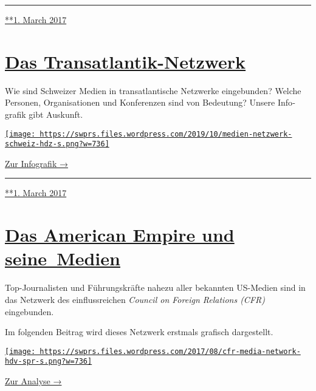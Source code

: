 \begin{center}\rule{0.5\linewidth}{\linethickness}\end{center}

\href{https://swprs.org/2017/03/01/eine-bruecke-ueber-den-atlantik/}{**1.
March 2017}

\hypertarget{das-transatlantik-netzwerk}{%
\section{\texorpdfstring{\href{https://swprs.org/2017/03/01/das-netzwerk/}{Das
Transatlantik-Netzwerk}}{Das Transatlantik-Netzwerk}}\label{das-transatlantik-netzwerk}}

Wie sind Schweizer Medien in trans­at­lantische Netz­werke
ein­ge­bunden? Welche Personen, Organi­sa­tionen und Kon­fe­ren­zen sind
von Bedeutung? Unsere Info­grafik gibt Auskunft.

\href{https://swprs.org/netzwerk-medien-schweiz}{\texttt{[image: https://swprs.files.wordpress.com/2019/10/medien-netzwerk-schweiz-hdz-s.png?w=736]}}

\href{https://swprs.org/netzwerk-medien-schweiz}{Zur Infografik →}

\begin{center}\rule{0.5\linewidth}{\linethickness}\end{center}

\href{https://swprs.org/2017/03/01/das-netzwerk/}{**1. March 2017}

\hypertarget{das-american-empire-und-seine-medien}{%
\section{\texorpdfstring{\href{https://swprs.org/2017/03/01/netzwerk-medien-usa/}{Das
American Empire und
seine~Medien}}{Das American Empire und seine~Medien}}\label{das-american-empire-und-seine-medien}}

Top-Journalisten und Führungskräfte nahezu aller bekannten US-Medien
sind in das Netz­werk des einflussreichen \emph{Council on Foreign
Relations (CFR)} eingebunden.

Im folgenden Beitrag wird dieses Netzwerk erstmals grafisch
dar­ge­stellt.

\href{https://swprs.org/das-american-empire-und-seine-medien/}{\texttt{[image: https://swprs.files.wordpress.com/2017/08/cfr-media-network-hdv-spr-s.png?w=736]}}

\href{https://swprs.org/das-american-empire-und-seine-medien/}{Zur
Analyse →}

